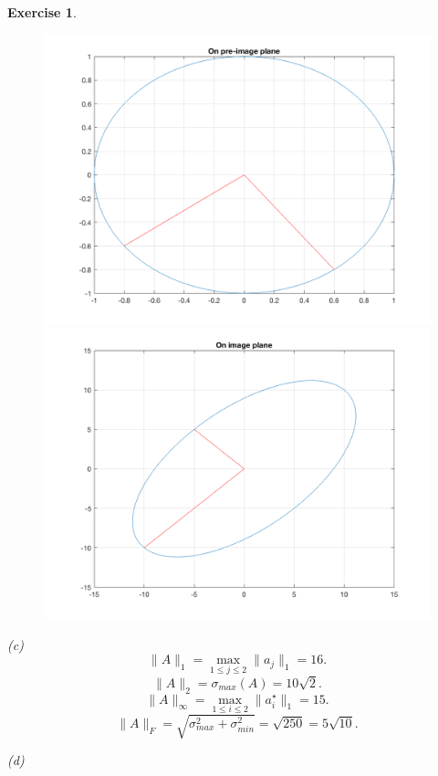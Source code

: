 \documentclass[paper=a4, fontsize=11pt]{scrartcl} %
\numberwithin{equation}{section} %
\numberwithin{figure}{section} %
\numberwithin{table}{section} %
\newtheorem{exercise}{Exercise}
\numberwithin{exercise}{section}
\begin{document}
\begin{exercise}
\begin{figure}[h]
\includegraphics[scale=0.2]{pre_image}
\includegraphics[scale=0.2]{image_after}
\end{figure}


\vspace{5mm}
(c)
$$\|A\|_{1}=\max_{1\leq j\leq 2} \|a_j\|_1=16.$$
$$\|A\|_{2}=\sigma_{max}(A)=10\sqrt{2}.$$
$$\|A\|_{\infty}=\max_{1\leq i\leq 2} \|a_i^{\star}\|_1=15.$$
$$\|A\|_{F}=\sqrt{\sigma_{max}^2+\sigma_{min}^2}=\sqrt{250} =5\sqrt{10}.$$

(d)
 

\end{exercise}
\end{document}
